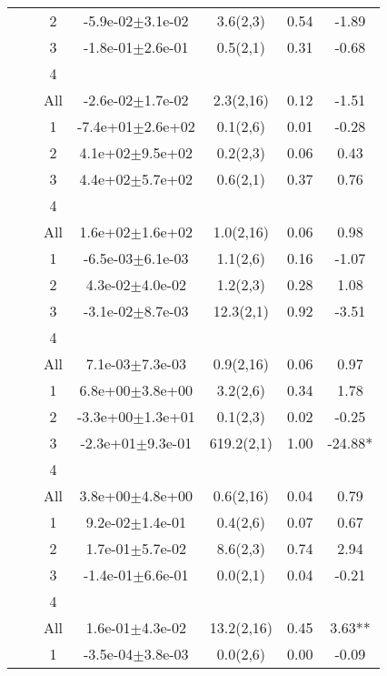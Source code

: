 \begin{longtable}{llccccS[table-format=-2.2, table-space-text-post = {***}]}
   &  & 2 & -5.9e-02$\pm$3.1e-02 & 3.6(2,3) & 0.54 & -1.89 \\ 
   &  & 3 & -1.8e-01$\pm$2.6e-01 & 0.5(2,1) & 0.31 & -0.68 \\ 
   &  & 4 &  &  &  &  \\ 
   &  & All & -2.6e-02$\pm$1.7e-02 & 2.3(2,16) & 0.12 & -1.51 \\ 
   \midrule
{} & {} & 1 & -7.4e+01$\pm$2.6e+02 & 0.1(2,6) & 0.01 & -0.28 \\ 
   &  & 2 &  4.1e+02$\pm$9.5e+02 & 0.2(2,3) & 0.06 & 0.43 \\ 
   &  & 3 &  4.4e+02$\pm$5.7e+02 & 0.6(2,1) & 0.37 & 0.76 \\ 
   &  & 4 &  &  &  &  \\ 
   &  & All &  1.6e+02$\pm$1.6e+02 & 1.0(2,16) & 0.06 & 0.98 \\ 
   \midrule
{} & {} & 1 & -6.5e-03$\pm$6.1e-03 & 1.1(2,6) & 0.16 & -1.07 \\ 
   &  & 2 &  4.3e-02$\pm$4.0e-02 & 1.2(2,3) & 0.28 & 1.08 \\ 
   &  & 3 & -3.1e-02$\pm$8.7e-03 & 12.3(2,1) & 0.92 & -3.51 \\ 
   &  & 4 &  &  &  &  \\ 
   &  & All &  7.1e-03$\pm$7.3e-03 & 0.9(2,16) & 0.06 & 0.97 \\ 
   \midrule
{} & {} & 1 &  6.8e+00$\pm$3.8e+00 & 3.2(2,6) & 0.34 & 1.78 \\ 
   &  & 2 & -3.3e+00$\pm$1.3e+01 & 0.1(2,3) & 0.02 & -0.25 \\ 
   &  & 3 & -2.3e+01$\pm$9.3e-01 & 619.2(2,1) & 1.00 & -24.88* \\ 
   &  & 4 &  &  &  &  \\ 
   &  & All &  3.8e+00$\pm$4.8e+00 & 0.6(2,16) & 0.04 & 0.79 \\ 
   \midrule
{} & {} & 1 &  9.2e-02$\pm$1.4e-01 & 0.4(2,6) & 0.07 & 0.67 \\ 
   &  & 2 &  1.7e-01$\pm$5.7e-02 & 8.6(2,3) & 0.74 & 2.94 \\ 
   &  & 3 & -1.4e-01$\pm$6.6e-01 & 0.0(2,1) & 0.04 & -0.21 \\ 
   &  & 4 &  &  &  &  \\ 
   &  & All &  1.6e-01$\pm$4.3e-02 & 13.2(2,16) & 0.45 & 3.63** \\ 
   \midrule
{} & {} & 1 & -3.5e-04$\pm$3.8e-03 & 0.0(2,6) & 0.00 & -0.09 \\ 

\end{longtable}
